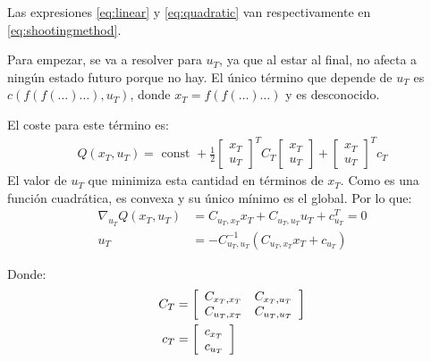 Las expresiones \ref{eq:linear} y \ref{eq:quadratic} van respectivamente en
\ref{eq:shootingmethod}.

Para empezar, se va a resolver para $u_T$, ya que al estar al final, no afecta a ningún
estado futuro porque no hay. El único término que depende de $u_T$ es
$c(f(f(\ldots)\ldots),u_T)$, donde  $x_T=f(f(\ldots)\ldots)$ y es desconocido.

El coste para este término es:
 \begin{align}
Q ( x _ { T } , u _ { T } ) = \text { const } + \frac { 1 } { 2 } \left[ \begin{array} { c } { x _ { T } } \\ { u _ { T } } \end{array} \right] ^ { T } C _ { T } \left[ \begin{array} { l } { x _ { T } } \\ { u _ { T } } \end{array} \right] + \left[ \begin{array} { l } { x _ { T } } \\ { u _ { T } } \end{array} \right] ^ { T } c _ { T }
\end{align}
El valor de $u_T$ que minimiza esta cantidad en términos de $x_T$. Como es una función
cuadrática, es convexa y su único mínimo es el global. Por lo que:
\begin{align}
    \nabla _ { u _ { T } } Q ( x _ { T } , u _ { T } ) &= C _ { u _ { T } , x _ { T } } x _ { T } + C
_ { u _ { T } , u _ { T } } u _ { T } + c _ { u _ { T } } ^ { T } = 0\\
    u _ { T } &= - C _ { u _ { T } , u _ { T } } ^ { - 1 } ( C _ { u _ { T } , x _ { T } } x _ { T } + c _ { u _ { T } } )
    \label{eq:ut}
\end{align}

Donde:
\begin{align}
    C _ { T } &= \left[ \begin{array} { l l } { C _ { x _ { T } , x _ { T } } } & { C _ { x _ { T
    } , u _ { T } } } \\ { C _ { u _ { T } , x _ { T } } } & { C _ { u _ { T } , u _ { T } } }
                \end{array} \right]\\
                c _ { T } &= \left[ \begin{array} { l } { c _ { x _ { T } } } \\ { c _ { u _ { T } } } \end{array} \right]
\end{align}

